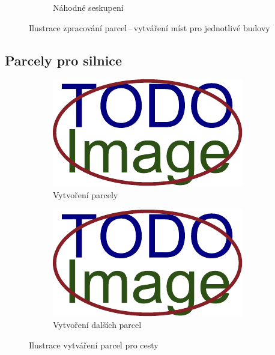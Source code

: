 \begin{figure}[H]
\begin{subfigure}{0.32\textwidth}
		\caption{Náhodné seskupení}
		\label{fig:parcely:budovy:dělení:seskupení}
	\end{subfigure}
	\caption{Ilustrace zpracování parcel\,--\,vytváření míst pro jednotlivé budovy}
	\label{fig:parcely:budovy:dělení}
\end{figure}

\subsection{Parcely pro silnice}\label{ch:impl:parcely:silnice}



\begin{figure}[H]
	\centering
	\begin{subfigure}{0.32\textwidth}
		\includegraphics[width=\textwidth]{obrazky-figures/placeholder.pdf}
		\caption{Vytvoření parcely}
		\label{fig:parcely:silnice:vytváření:první}
	\end{subfigure}%
	\hspace{0.02\textwidth}%
	\begin{subfigure}{0.32\textwidth}
		\includegraphics[width=\textwidth]{obrazky-figures/placeholder.pdf}
		\caption{Vytvoření dalších parcel}
		\label{fig:parcely:silnice:vytváření:další}
	\end{subfigure}
	\caption{Ilustrace vytváření parcel pro cesty}
	\label{fig:parcely:silnice:vytváření}
\end{figure}



